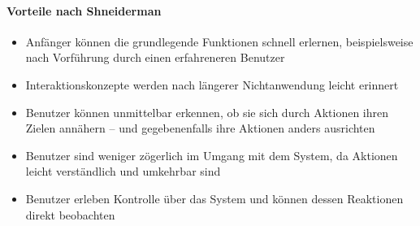 \documentclass[8pt,a4paper,landscape]{extarticle}
\begin{document}
\begin{multicols*}{4}
	\paragraph{Vorteile nach Shneiderman}
	\begin{itemize}
		\item Anfänger können die grundlegende Funktionen schnell erlernen,
		      beispielsweise nach Vorführung durch einen erfahreneren Benutzer
		\item Interaktionskonzepte werden nach längerer Nichtanwendung leicht
		      erinnert
		\item Benutzer können unmittelbar erkennen, ob sie sich durch Aktionen
		      ihren Zielen annähern – und gegebenenfalls ihre Aktionen anders
		      ausrichten
		\item Benutzer sind weniger zögerlich im Umgang mit dem System, da
		      Aktionen leicht verständlich und umkehrbar sind
		\item Benutzer erleben Kontrolle über das System und können dessen
		      Reaktionen direkt beobachten
	\end{itemize}
\end{multicols*}
\end{document}

